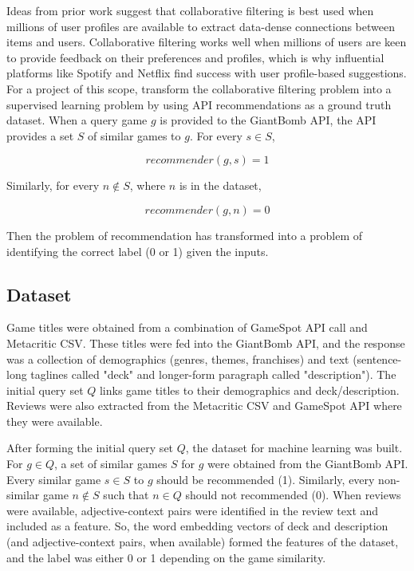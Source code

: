 \documentclass[10pt,twocolumn]{article}
\begin{document}
Ideas from prior work suggest that collaborative filtering is best used when millions of user profiles are available to extract data-dense connections between items and users. Collaborative filtering works well when millions of users are keen to provide feedback on their preferences and profiles, which is why influential platforms like Spotify \cite{JacobsonSpotify}
and Netflix \cite{NetflixRS} find success with user profile-based suggestions. For a project of this scope, transform the collaborative filtering problem into a supervised learning problem by using API recommendations as a ground truth dataset. When a query game $g$ is provided to the GiantBomb API, the API provides a set $S$ of similar games to $g$. For every $s \in S$, 

\begin{equation}
    recommender(g, s) = 1
\end{equation}

Similarly, for every $n \not\in S$, where $n$ is in the dataset,

\begin{equation}
    recommender(g, n) = 0
\end{equation}

Then the problem of recommendation has transformed into a problem of identifying the correct label (0 or 1) given the inputs.

\subsection{Dataset}

Game titles were obtained from a combination of GameSpot API call and Metacritic CSV. These titles were fed into the GiantBomb API, and the response was a collection of demographics (genres, themes, franchises) and text (sentence-long taglines called "deck" and longer-form paragraph called "description"). The initial query set $Q$ links game titles to their demographics and deck/description. Reviews were also extracted from the Metacritic CSV and GameSpot API where they were available.

After forming the initial query set $Q$, the dataset for machine learning was built. For $g \in Q$, a set of similar games $S$ for $g$ were obtained from the GiantBomb API. Every similar game $s \in S$ to $g$ should be recommended (1). Similarly, every non-similar game $n \not\in S$ such that $n \in Q$ should not recommended (0). When reviews were available, adjective-context pairs were identified in the review text and included as a feature. \cite{Meidl} So, the word embedding vectors of deck and description (and adjective-context pairs, when available) formed the features of the dataset, and the label was either 0 or 1 depending on the game similarity.
\end{document}
